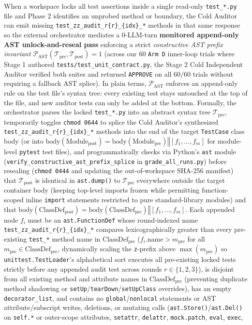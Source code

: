 \documentclass[11pt,a4paper,copyright]{google}
\begin{document}
\begin{enumerate}[leftmargin=1.5em,itemsep=3pt,topsep=3pt]
  When a workspace locks all test assertions inside a single read-only \texttt{test\_*.py} file and Phase 2 identifies an unprobed method or boundary, the Cold Auditor can emit missing \texttt{test\_zz\_audit\_r\{r\}\_\{idx\}\_*} methods in that same response so the external orchestrator mediates a 0-LLM-turn \textbf{monitored append-only AST unlock-and-reseal pass} enforcing a strict \emph{constructive AST prefix invariant} $\mathcal{P}_{\text{AST}}(\mathcal{T}_{\text{pre}}, \mathcal{T}_{\text{post}}) = 1$ (across our 60 \texttt{Arm D} inner-loop trials where Stage 1 authored \texttt{tests/\allowbreak test\_unit\_contract.py}, the Stage 2 Cold Independent Auditor verified both suites and returned \texttt{APPROVE} on all $60/60$ trials without requiring a fallback AST splice). In plain terms, $\mathcal{P}_{\text{AST}}$ enforces an append-only rule on the test file's syntax tree: every existing test stays untouched at the top of the file, and new auditor tests can only be added at the bottom. Formally, the orchestrator parses the locked \texttt{test\_*.py} into an abstract syntax tree $\mathcal{T}_{\text{pre}}$, temporarily toggles \texttt{chmod 0644} to splice the Cold Auditor's synthesized \texttt{test\_zz\_audit\_r\{r\}\_\{idx\}\_*} methods into the end of the target \texttt{TestCase} class body (or into $\text{body}(\text{Module}_{\text{post}}) = \text{body}(\text{Module}_{\text{pre}}) \mathbin{\Vert} [f_1, \dots, f_m]$ for module-level \texttt{pytest} test files), and programmatically checks via Python's \texttt{ast} module (\texttt{verify\_constructive\_ast\_prefix\_splice} in \texttt{grade\_all\_runs.py}) before resealing (\texttt{chmod 0444} and updating the out-of-workspace SHA-256 manifest) that $\mathcal{T}_{\text{post}}$ is identical in \texttt{ast.dump()} to $\mathcal{T}_{\text{pre}}$ everywhere outside the target container body (keeping top-level imports frozen while permitting function-scoped inline \texttt{import} statements restricted to pure standard-library modules) and that $\text{body}(\text{ClassDef}_{\text{post}}) = \text{body}(\text{ClassDef}_{\text{pre}}) \mathbin{\Vert} [f_1, \dots, f_m]$. Each appended node $f_i$ must be an \texttt{ast.FunctionDef} whose round-indexed name \texttt{test\_zz\_audit\_r\{r\}\_\{idx\}\_*} compares lexicographically greater than every pre-existing \texttt{test\_*} method name in $\text{ClassDef}_{\text{pre}}$ ($f_i.\text{name} > m_{\text{pre}}$ for all $m_{\text{pre}} \in \text{ClassDef}_{\text{pre}}$, dynamically scaling the \texttt{z}-prefix above $\max(m_{\text{pre}})$ so \texttt{unittest.TestLoader}'s alphabetical sort executes all pre-existing locked tests strictly before any appended audit test across rounds $r \in \{1, 2, 3\}$), is disjoint from all existing method and attribute names in $\text{ClassDef}_{\text{pre}}$ (preventing duplicate method shadowing or \texttt{setUp}/\texttt{tearDown}/\texttt{setUpClass} overrides), has an empty \texttt{decorator\_list}, and contains no \texttt{global}/\texttt{nonlocal} statements or AST attribute/subscript writes, deletions, or mutating calls (\texttt{ast.Store()}/\texttt{ast.Del()} on \texttt{self.*} or outer-scope attributes, \texttt{setattr}, \texttt{delattr}, \texttt{mock.patch}, \texttt{eval}, \texttt{exec}, 
\end{enumerate}
\end{document}
